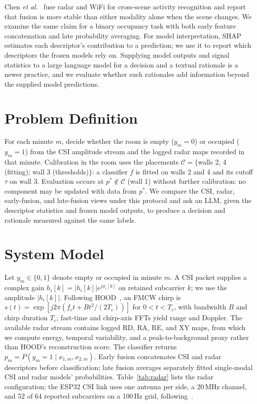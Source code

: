 \documentclass[conference,10pt,letterpaper]{IEEEtran}
\begin{document}
Chen \emph{et al.}~\cite{fusion} fuse radar and WiFi for cross-scene activity recognition and report that fusion is more stable than either modality alone when the scene changes. We examine the same claim for a binary occupancy task with both early feature concatenation and late probability averaging. For model interpretation, SHAP~\cite{shap} estimates each descriptor's contribution to a prediction; we use it to report which descriptors the frozen models rely on. Supplying model outputs and signal statistics to a large language model for a decision and a textual rationale is a newer practice, and we evaluate whether such rationales add information beyond the supplied model predictions.

\section{Problem Definition}\label{sec:problem}
For each minute $m$, decide whether the room is empty ($y_m=0$) or occupied ($y_m=1$) from the CSI amplitude stream and the logged radar maps recorded in that minute. Calibration in the room uses the placements $\mathcal{C}=\{$walls 2, 4 (fitting); wall 3 (thresholds)$\}$: a classifier $f$ is fitted on walls 2 and 4 and its cutoff $\tau$ on wall 3. Evaluation occurs at $p^\ast\notin\mathcal{C}$ (wall 1) without further calibration: no component may be updated with data from $p^\ast$. We compare the CSI, radar, early-fusion, and late-fusion views under this protocol and ask an LLM, given the descriptor statistics and frozen model outputs, to produce a decision and rationale measured against the same labels.

\section{System Model}\label{sec:system}
Let $y_m\in\{0,1\}$ denote empty or occupied in minute $m$. A CSI packet supplies a complex gain $h_i[k]=|h_i[k]|e^{j\phi_i[k]}$ on retained subcarrier $k$; we use the amplitude $|h_i[k]|$. Following HOOD~\cite{hood}, an FMCW chirp is $s(t)=\exp[j2\pi(f_ct+Bt^2/(2T_c))]$ for $0<t<T_c$, with bandwidth $B$ and chirp duration $T_c$; fast-time and chirp-axis FFTs yield range and Doppler. The available radar stream contains logged RD, RA, RE, and XY maps, from which we compute energy, temporal variability, and a peak-to-background proxy rather than HOOD's reconstruction score. The classifier returns $p_m=P(y_m=1\mid x_{1,m},x_{2,m})$. Early fusion concatenates CSI and radar descriptors before classification; late fusion averages separately fitted single-modal CSI and radar models' probabilities. Table~\ref{tab:radar} lists the radar configuration; the ESP32 CSI link uses one antenna per side, a 20\,MHz channel, and 52 of 64 reported subcarriers on a 100\,Hz grid, following~\cite{wifi}.
\end{document}
